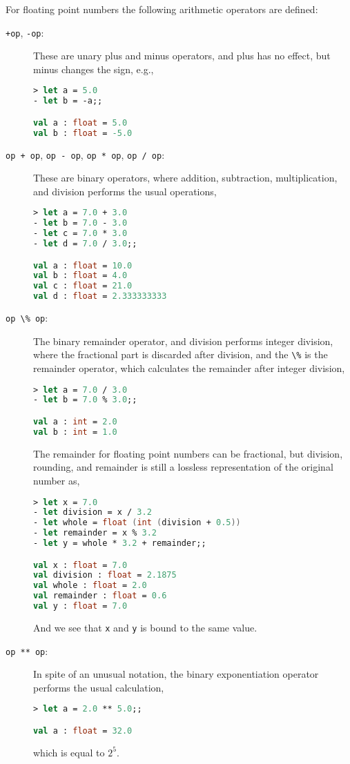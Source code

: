 For floating point numbers the following arithmetic operators are defined: 
\begin{description}
\item[\texttt{+op}, \texttt{-op}:] These are unary plus and minus operators, and plus has no effect, but minus changes the sign, e.g.,
%
\begin{lstlisting}[language=fsharp,caption={fsharpi, unary floating point negation operator.}]
> let a = 5.0 
- let b = -a;;

val a : float = 5.0
val b : float = -5.0
\end{lstlisting}
\item[\lstinline|op + op|, \lstinline|op - op|, \lstinline|op * op|, \lstinline|op / op|:] These are binary operators, where addition, subtraction, multiplication, and division performs the usual operations, 
%
\begin{lstlisting}[language=fsharp,caption={fsharpi, binary floating point addition, subtraction, multiplication, and division operators.}]
> let a = 7.0 + 3.0
- let b = 7.0 - 3.0
- let c = 7.0 * 3.0
- let d = 7.0 / 3.0;;

val a : float = 10.0
val b : float = 4.0
val c : float = 21.0
val d : float = 2.333333333
\end{lstlisting}
\item[\lstinline|op \% op|:] The binary remainder operator, and division performs integer division, where the fractional part is discarded after division, and the \lstinline|\%| is the remainder operator, which calculates the remainder after integer division,
%
\begin{lstlisting}[language=fsharp,caption={fsharpi, binary floating point division and remainder operators.}]
> let a = 7.0 / 3.0
- let b = 7.0 % 3.0;;

val a : int = 2.0
val b : int = 1.0
\end{lstlisting}
The remainder for floating point numbers can be fractional, but division, rounding, and remainder is still a lossless representation of the original number as,
%
\begin{lstlisting}[language=fsharp,caption={fsharpi, floating point division, truncation, and remainder is a lossless representation of a number.}]
> let x = 7.0
- let division = x / 3.2
- let whole = float (int (division + 0.5))
- let remainder = x % 3.2
- let y = whole * 3.2 + remainder;;

val x : float = 7.0
val division : float = 2.1875
val whole : float = 2.0
val remainder : float = 0.6
val y : float = 7.0
\end{lstlisting}
And we see that \lstinline|x| and \lstinline|y| is bound to the same value.  
\item[\texttt{op ** op}:] In spite of an unusual notation, the binary exponentiation operator performs the usual calculation,
%
\begin{lstlisting}[language=fsharp,caption={fsharpi, binary floating point exponentiation.}]
> let a = 2.0 ** 5.0;;

val a : float = 32.0
\end{lstlisting}
which is equal to $2^5$.
\end{description}

